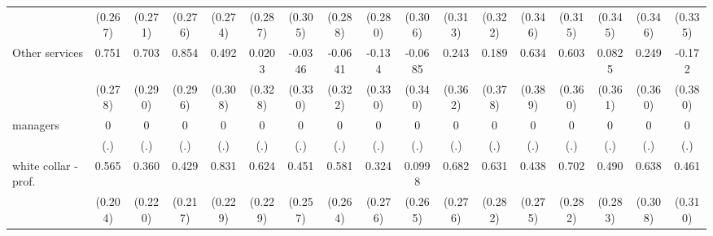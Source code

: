 {\begin{tabular}{l*{16}{c}}
                    &     (0.267)         &     (0.271)         &     (0.276)         &     (0.274)         &     (0.287)         &     (0.305)         &     (0.288)         &     (0.280)         &     (0.306)         &     (0.313)         &     (0.322)         &     (0.346)         &     (0.315)         &     (0.345)         &     (0.346)         &     (0.335)         \\
[1em]
Other services      &       0.751\sym{**} &       0.703\sym{*}  &       0.854\sym{**} &       0.492         &      0.0203         &     -0.0346         &     -0.0641         &      -0.134         &     -0.0685         &       0.243         &       0.189         &       0.634         &       0.603         &      0.0825         &       0.249         &      -0.172         \\
                    &     (0.278)         &     (0.290)         &     (0.296)         &     (0.308)         &     (0.328)         &     (0.330)         &     (0.322)         &     (0.330)         &     (0.340)         &     (0.362)         &     (0.378)         &     (0.389)         &     (0.360)         &     (0.361)         &     (0.360)         &     (0.380)         \\
[1em]
managers            &           0         &           0         &           0         &           0         &           0         &           0         &           0         &           0         &           0         &           0         &           0         &           0         &           0         &           0         &           0         &           0         \\
                    &         (.)         &         (.)         &         (.)         &         (.)         &         (.)         &         (.)         &         (.)         &         (.)         &         (.)         &         (.)         &         (.)         &         (.)         &         (.)         &         (.)         &         (.)         &         (.)         \\
[1em]
white collar - prof.&       0.565\sym{**} &       0.360         &       0.429\sym{*}  &       0.831\sym{***}&       0.624\sym{**} &       0.451         &       0.581\sym{*}  &       0.324         &      0.0998         &       0.682\sym{*}  &       0.631\sym{*}  &       0.438         &       0.702\sym{*}  &       0.490         &       0.638\sym{*}  &       0.461         \\
                    &     (0.204)         &     (0.220)         &     (0.217)         &     (0.229)         &     (0.229)         &     (0.257)         &     (0.264)         &     (0.276)         &     (0.265)         &     (0.276)         &     (0.282)         &     (0.275)         &     (0.282)         &     (0.283)         &     (0.308)         &     (0.310)         \\

\end{tabular}}

